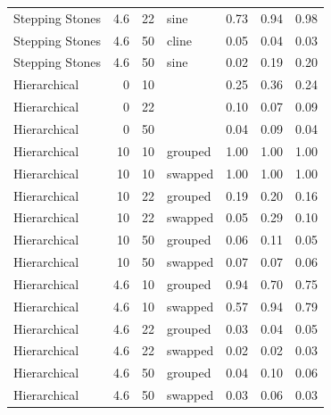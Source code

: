 \begin{table}[ht]
\begin{tabular}{lrrlrrr}
  Stepping Stones & 4.6 & 22 & sine & 0.73 & 0.94 & 0.98 \\ 
  Stepping Stones & 4.6 & 50 & cline & 0.05 & 0.04 & 0.03 \\ 
  Stepping Stones & 4.6 & 50 & sine & 0.02 & 0.19 & 0.20 \\ 
  Hierarchical & 0 & 10 &  & 0.25 & 0.36 & 0.24 \\ 
  Hierarchical & 0 & 22 &  & 0.10 & 0.07 & 0.09 \\ 
  Hierarchical & 0 & 50 &  & 0.04 & 0.09 & 0.04 \\ 
  Hierarchical & 10 & 10 & grouped & 1.00 & 1.00 & 1.00 \\ 
  Hierarchical & 10 & 10 & swapped & 1.00 & 1.00 & 1.00 \\ 
  Hierarchical & 10 & 22 & grouped & 0.19 & 0.20 & 0.16 \\ 
  Hierarchical & 10 & 22 & swapped & 0.05 & 0.29 & 0.10 \\ 
  Hierarchical & 10 & 50 & grouped & 0.06 & 0.11 & 0.05 \\ 
  Hierarchical & 10 & 50 & swapped & 0.07 & 0.07 & 0.06 \\ 
  Hierarchical & 4.6 & 10 & grouped & 0.94 & 0.70 & 0.75 \\ 
  Hierarchical & 4.6 & 10 & swapped & 0.57 & 0.94 & 0.79 \\ 
  Hierarchical & 4.6 & 22 & grouped & 0.03 & 0.04 & 0.05 \\ 
  Hierarchical & 4.6 & 22 & swapped & 0.02 & 0.02 & 0.03 \\ 
  Hierarchical & 4.6 & 50 & grouped & 0.04 & 0.10 & 0.06 \\ 
  Hierarchical & 4.6 & 50 & swapped & 0.03 & 0.06 & 0.03 \\ 
   \bottomrule
\end{tabular}
\end{table}
